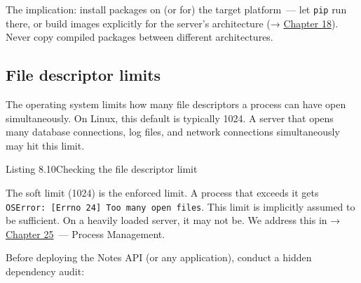 The implication: install packages on (or for) the target platform~--- let \texttt{pip} run there, or build images explicitly for the server's architecture (→ \hyperref[ch:18-containerization]{Chapter 18}). Never copy compiled packages between different architectures.

\subsection*{File descriptor limits}\label{08-hidden-dependencies:file-descriptor-limits}

The operating system limits how many file descriptors a process can have open simultaneously. On Linux, this default is typically 1024. A server that opens many database connections, log files, and network connections simultaneously may hit this limit.

\begin{codeboxcap}[short]{\textcolor{accent}{Listing 8.10}\enspace Checking the file descriptor limit}

\begin{Shaded}
\begin{Highlighting}[]

\OperatorTok{=}
\NormalTok{(}\SpecialCharTok{\{}\SpecialCharTok{\}}\SpecialCharTok{\{}\SpecialCharTok{\}}\NormalTok{)}
\end{Highlighting}
\end{Shaded}

\end{codeboxcap}

\noindent{}The soft limit (1024) is the enforced limit. A process that exceeds it gets \texttt{OSError:}\allowbreak{}\texttt{\ {[}Errno\ 24{]}\ Too\ many\ open\ files}. This limit is implicitly assumed to be sufficient. On a heavily loaded server, it may not be. We address this in → \hyperref[ch:25-process-management]{Chapter 25}~--- Process Management.

\label{08-hidden-dependencies:the-hidden-dependency-audit}

Before deploying the Notes API (or any application), conduct a hidden dependency audit:

